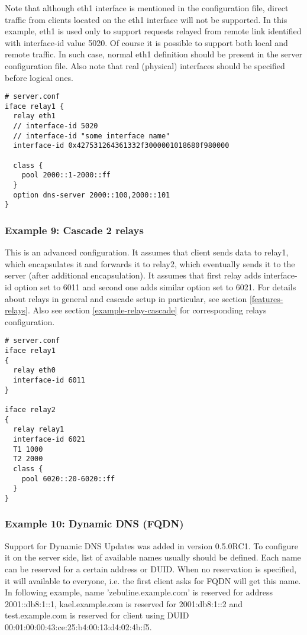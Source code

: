 Note that although eth1 interface is mentioned in the configuration file,
direct traffic from clients located on the eth1 interface will not be
supported. In this example, eth1 is used only to support requests
relayed from remote link identified with interface-id value 5020.
Of course it is possible to support both local and remote traffic. In
such case, normal eth1 definition should be present in the server
configuration file. Also note that real (physical) interfaces should
be specified before logical ones.

\begin{lstlisting}
# server.conf
iface relay1 {
  relay eth1
  // interface-id 5020
  // interface-id "some interface name"
  interface-id 0x427531264361332f3000001018680f980000

  class {
    pool 2000::1-2000::ff
  }
  option dns-server 2000::100,2000::101
}
\end{lstlisting}

\subsubsection{Example 9: Cascade 2 relays}
\label{example-server-relay2}
This is an advanced configuration. It assumes that client sends data to
relay1, which encapsulates it and forwards it to relay2, which
eventually sends it to the server (after additional encapsulation). It
assumes that first relay adds interface-id option set to 6011 and
second one adds similar option set to 6021. For details about relays
in general and cascade setup in particular, see section
\ref{features-relays}. Also see section \ref{example-relay-cascade}
for corresponding relays configuration.

\begin{lstlisting}
# server.conf
iface relay1
{
  relay eth0
  interface-id 6011
}

iface relay2
{
  relay relay1
  interface-id 6021
  T1 1000
  T2 2000
  class {
    pool 6020::20-6020::ff
  }
}
\end{lstlisting}

\subsubsection{Example 10: Dynamic DNS (FQDN)}
\label{example-server-fqdn}

Support for Dynamic DNS Updates was added in version 0.5.0RC1. To
configure it on the server side, list of available names usually
should be defined. Each name can be reserved for a certain address or
DUID. When no reservation is specified, it will available to everyone,
i.e. the first client asks for FQDN will get this name. In following
example, name 'zebuline.example.com' is reserved for address 2001::db8:1::1,
kael.example.com is reserved for 2001:db8:1::2 and test.example.com is
reserved for client using DUID
00:01:00:00:43:ce:25:b4:00:13:d4:02:4b:f5.

